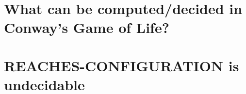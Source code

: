 \documentclass{article}
\theoremstyle{definition}
\theoremstyle{plain}
\theoremstyle{plain}
\begin{document}
\section{What can be computed/decided in Conway’s Game of Life?}

\section{REACHES-CONFIGURATION is undecidable}

\printbibliography
\end{document}

